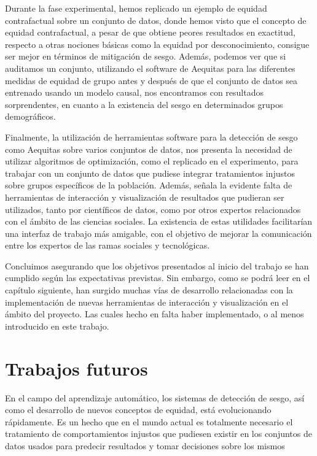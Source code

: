 \documentclass[oneside,openright,titlepage,numbers=noenddot,openany,headinclude,footinclude=true,
cleardoublepage=empty,abstractoff,BCOR=5mm,paper=a4,fontsize=12pt,main=spanish]{scrreprt}
\begin{document}
Durante la fase experimental, hemos replicado un ejemplo de equidad contrafactual sobre un conjunto de datos, donde hemos visto que el concepto de equidad contrafactual, a pesar de que obtiene peores resultados en exactitud, respecto a otras nociones básicas como la equidad por desconocimiento, consigue ser mejor en términos de mitigación de sesgo. Además, podemos ver que si auditamos un conjunto, utilizando el software de Aequitas para las diferentes medidas de equidad de grupo antes y después de que el conjunto de datos sea entrenado usando un modelo causal, nos encontramos con resultados sorprendentes, en cuanto a la existencia del sesgo en determinados grupos demográficos.

Finalmente, la utilización de herramientas software para la detección de sesgo como Aequitas sobre varios conjuntos de datos, nos presenta la necesidad de utilizar algoritmos de optimización, como el replicado en el experimento, para trabajar con un conjunto de datos que pudiese integrar tratamientos injustos sobre grupos específicos de la población. Además, señala la evidente falta de herramientas de interacción y visualización de resultados que pudieran ser utilizados, tanto por científicos de datos, como por otros expertos relacionados con el ámbito de las ciencias sociales. La existencia de estas utilidades facilitarían una interfaz de trabajo más amigable, con el objetivo de mejorar la comunicación entre los expertos de las ramas sociales y tecnológicas.

Concluimos asegurando que los objetivos presentados al inicio del trabajo se han cumplido según las expectativas previstas. Sin embargo, como se podrá leer en el capítulo siguiente, han surgido muchas vías de desarrollo relacionadas con la implementación de nuevas herramientas de interacción y visualización en el ámbito del proyecto. Las cuales hecho en falta haber implementado, o al menos introducido en este trabajo.  

\chapter{Trabajos futuros} \label{ch:trabajos_fut}

En el campo del aprendizaje automático, los sistemas de detección de sesgo, así como el desarrollo de nuevos conceptos de equidad, está evolucionando rápidamente. Es un hecho que en el mundo actual es totalmente necesario el tratamiento de comportamientos injustos que pudiesen existir en los conjuntos de datos usados para predecir resultados y tomar decisiones sobre los mismos
\end{document}
